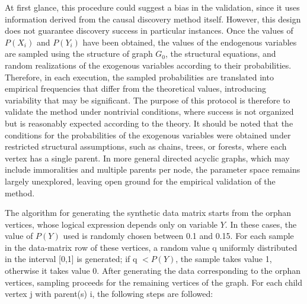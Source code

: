 \documentclass[12pt,a4paper]{report}
\begin{document}
At first glance, this procedure could suggest a bias in the validation, since it uses information derived from the causal discovery method itself. However, this design does not guarantee discovery success in particular instances. Once the values of $P(X_i)$ and $P(Y_i)$ have been obtained, the values of the endogenous variables are sampled using the structure of graph $G_0$, the structural equations, and random realizations of the exogenous variables according to their probabilities. Therefore, in each execution, the sampled probabilities are translated into empirical frequencies that differ from the theoretical values, introducing variability that may be significant. The purpose of this protocol is therefore to validate the method under nontrivial conditions, where success is not organized but is reasonably expected according to the theory. It should be noted that the conditions for the probabilities of the exogenous variables were obtained under restricted structural assumptions, such as chains, trees, or forests, where each vertex has a single parent. In more general directed acyclic graphs, which may include immoralities and multiple parents per node, the parameter space remains largely unexplored, leaving open ground for the empirical validation of the method.


The algorithm for generating the synthetic data matrix starts from the orphan vertices, whose logical expression depends only on variable $Y$. In these cases, the value of $P(Y)$ used is randomly chosen between 0.1 and 0.15. For each sample in the data-matrix row of these vertices, a random value q uniformly distributed in the interval [0,1] is generated; if q $< P(Y)$, the sample takes value 1, otherwise it takes value 0.
After generating the data corresponding to the orphan vertices, sampling proceeds for the remaining vertices of the graph. For each child vertex j with parent(s) i, the following steps are followed:
\end{document}
